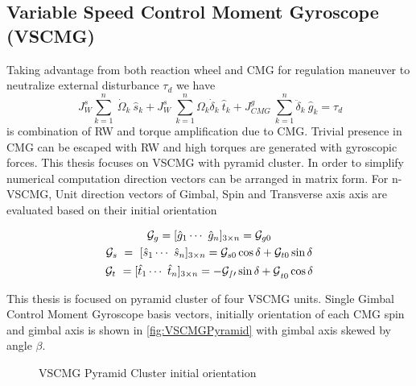 \subsection{Variable Speed Control Moment Gyroscope (VSCMG)}

Taking advantage from both reaction wheel and CMG for regulation maneuver to neutralize external disturbance $\displaystyle \tau _{d}$ we have
\begin{equation}
\ J^{s}_{W}\sum ^{n}_{k=1} \ \dot{\Omega }_{k} \ \hat{s}_{k} +J^{s}_{W} \ \sum ^{n}_{k=1} \Omega _{k}\dot{\delta}_{k} \ \hat{t}_{k} +J^{g}_{CMG} \ \sum ^{n}_{k=1}\ddot{\delta}_{k} \ \hat{g}_{k} =\tau _{d}
\end{equation}
is combination of RW and torque amplification due to CMG. Trivial presence in CMG can be escaped with RW and high torques are generated with gyroscopic forces. This thesis focuses on VSCMG with pyramid cluster. In order to simplify numerical computation direction vectors can be arranged in matrix form. For n-VSCMG, Unit direction vectors of Gimbal, Spin and Transverse axis axis are evaluated based on their initial orientation

\begin{gather}
\mathcal{G}_{g} =[\hat{g}_{1} \cdots \ \hat{g}_{n}]_{3\times n} =\mathcal{G}_{g0} \notag\\
\mathcal{G}_{s} \ =\ [\hat{s}_{1} \cdots \ \hat{s}_{n}]_{3\times n} =\mathcal{G}_{s0}\cos \delta +\mathcal{G}_{t0}\sin \delta  \notag\\
\mathcal{G}_{t} \ =[\hat{t}_{1} \cdots \ \hat{t}_{n}]_{3\times n} =\mathcal{- G_{s0}\sin \delta +G}_{t0}\cos \delta 
\end{gather}

This thesis is focused on pyramid cluster of four VSCMG units. Single Gimbal Control Moment Gyroscope basis vectors, initially orientation of each CMG spin and gimbal axis is shown in \autoref{fig:VSCMGPyramid} with gimbal axis skewed by angle $\beta$.


\begin{figure}[h]
\centering

\caption{VSCMG Pyramid Cluster initial orientation}
\label{fig:VSCMGPyramid}
\end{figure}

